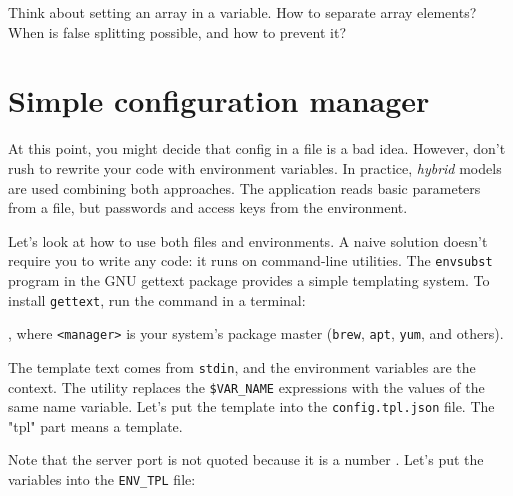 Think about setting an array in a variable. How to separate array elements? When is false splitting possible, and how to prevent it?

\section{Simple configuration manager}


At this point, you might decide that config in a file is a bad idea. However, don't rush to rewrite your code with environment variables. In practice, \emph{hybrid} models are used combining both approaches. The application reads basic parameters from a file, but passwords and access keys from the environment.


Let's look at how to use both files and environments. A naive solution doesn't require you to write any code: it runs on command-line utilities. The \verb|envsubst| program in the GNU gettext package provides a simple templating system. To install \verb|gettext|, run the command in a terminal:



\noindent
, where \verb|<manager>| is your system's package master (\verb|brew|, \verb|apt|, \verb|yum|, and others).


The template text comes from \verb|stdin|, and the environment variables are the context. The utility replaces the \verb|$VAR_NAME| expressions with the values of the same name variable. Let's put the template into the \verb|config.tpl.json| file. The "tpl" part means a template.


\noindent
Note that the server port is not quoted because it is a number . Let's put the variables into the \verb|ENV_TPL| file:

\begin{bash}
$ cat ENV_TPL
DB_NAME=book
DB_USER=ivan
DB_PASS='*(&fd}A53z#$!'
HTTP_PORT=8080
EVENT_START='2019-07-05T12:00:00'
EVENT_END='2019-07-12T23:59:59'
\end{bash}

